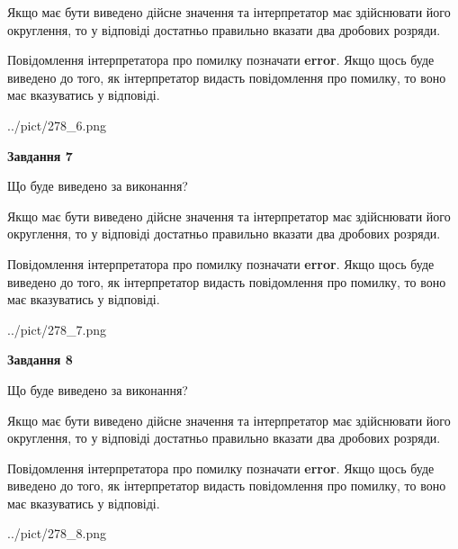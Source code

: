 \documentclass[12pt, ukrainian]{article}
\begin{document}
{\begin {Large}
Якщо має бути виведено дійсне значення та інтерпретатор має здійснювати його округлення, 
то у відповіді достатньо правильно вказати два дробових розряди.

Повідомлення інтерпретатора про помилку позначати \textbf{error}.
Якщо щось буде виведено до того, як інтерпретатор видасть повідомлення про помилку, 
то воно має вказуватись у відповіді. \par

\begin{center}
	{../pict/278_6.png}
\end{center}
\newpage

{\begin {center}\textbf{Завдання 7}\end {center}}\par
Що буде виведено за виконання? \par

Якщо має бути виведено дійсне значення та інтерпретатор має здійснювати його округлення, 
то у відповіді достатньо правильно вказати два дробових розряди.

Повідомлення інтерпретатора про помилку позначати \textbf{error}.
Якщо щось буде виведено до того, як інтерпретатор видасть повідомлення про помилку, 
то воно має вказуватись у відповіді. \par

\begin{center}
	{../pict/278_7.png}
\end{center}
\newpage

{\begin {center}\textbf{Завдання 8}\end {center}}\par
Що буде виведено за виконання? \par

Якщо має бути виведено дійсне значення та інтерпретатор має здійснювати його округлення, 
то у відповіді достатньо правильно вказати два дробових розряди.

Повідомлення інтерпретатора про помилку позначати \textbf{error}.
Якщо щось буде виведено до того, як інтерпретатор видасть повідомлення про помилку, 
то воно має вказуватись у відповіді. \par

\begin{center}
	{../pict/278_8.png}
\end{center}
\newpage


\end{Large}}
\end{document}

